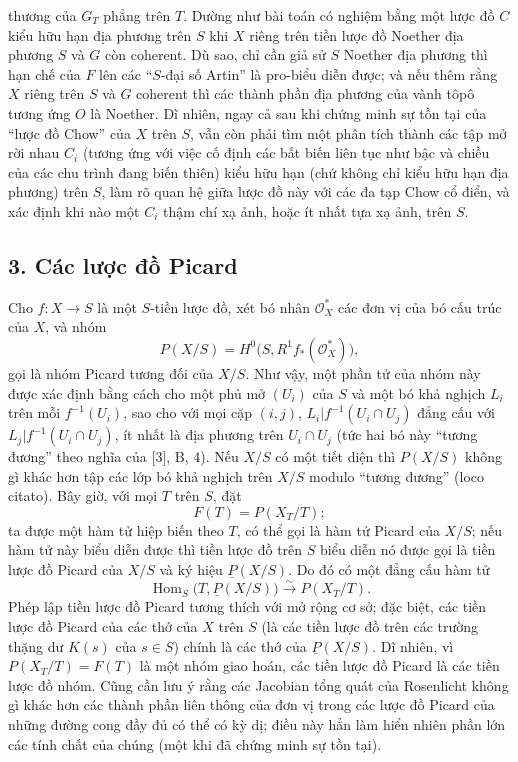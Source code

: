 thương của $G_T$ phẳng trên $T$. Dường như bài toán có nghiệm bằng một lược đồ
$C$ kiểu hữu hạn địa phương trên $S$ khi $X$ riêng trên tiền lược đồ Noether
địa phương $S$ và $G$ còn coherent. Dù sao, chỉ cần giả sử $S$ Noether địa
phương thì hạn chế của $F$ lên các ``$S$-đại số Artin'' là pro-biểu diễn được;
và nếu thêm rằng $X$ riêng trên $S$ và $G$ coherent thì các thành phần địa
phương của vành tôpô tương ứng $O$ là Noether. Dĩ nhiên, ngay cả sau khi chứng
minh sự tồn tại của ``lược đồ Chow'' của $X$ trên $S$, vẫn còn phải tìm một
phân tích thành các tập mở rời nhau $C_i$ (tương ứng với việc cố định các bất
biến liên tục như bậc và chiều của các chu trình đang biến thiên) kiểu hữu hạn
(chứ không chỉ kiểu hữu hạn địa phương) trên $S$, làm rõ quan hệ giữa lược đồ
này với các đa tạp Chow cổ điển, và xác định khi nào một $C_i$ thậm chí xạ ảnh,
hoặc ít nhất tựa xạ ảnh, trên $S$.

\subsection*{3. Các lược đồ Picard}

Cho $f:X\longrightarrow S$ là một $S$-tiền lược đồ, xét bó nhân
$\mathcal O_X^*$ các đơn vị của bó cấu trúc của $X$, và nhóm
\[
  P(X/S)=H^0\bigl(S,R^1f_*(\mathcal O_X^*)\bigr),
\]
gọi là nhóm Picard tương đối của $X/S$. Như vậy, một phần tử của nhóm này được
xác định bằng cách cho một phủ mở $(U_i)$ của $S$ và một bó khả nghịch $L_i$
trên mỗi $f^{-1}(U_i)$, sao cho với mọi cặp $(i,j)$,
$L_i|f^{-1}(U_i\cap U_j)$ đẳng cấu với
$L_j|f^{-1}(U_i\cap U_j)$, ít nhất là địa phương trên $U_i\cap U_j$ (tức hai bó
này ``tương đương'' theo nghĩa của [3], B, 4). Nếu $X/S$ có một tiết diện thì
$P(X/S)$ không gì khác hơn tập các lớp bó khả nghịch trên $X/S$ modulo
``tương đương'' (loco citato). Bây giờ, với mọi $T$ trên $S$, đặt
\[
  F(T)=P(X_T/T) ;
\]
ta được một hàm tử hiệp biến theo $T$, có thể gọi là hàm tử Picard của $X/S$;
nếu hàm tử này biểu diễn được thì tiền lược đồ trên $S$ biểu diễn nó được gọi
là tiền lược đồ Picard của $X/S$ và ký hiệu $\underline P(X/S)$. Do đó có một
đẳng cấu hàm tử
\[
  \operatorname{Hom}_S\bigl(T,\underline P(X/S)\bigr)
  \xrightarrow{\sim}P(X_T/T).
\]
Phép lập tiền lược đồ Picard tương thích với mở rộng cơ sở; đặc biệt, các tiền
lược đồ Picard của các thớ của $X$ trên $S$ (là các tiền lược đồ trên các
trường thặng dư $K(s)$ của $s\in S$) chính là các thớ của
$\underline P(X/S)$. Dĩ nhiên, vì $P(X_T/T)=F(T)$ là một nhóm giao hoán, các
tiền lược đồ Picard là các tiền lược đồ nhóm. Cũng cần lưu ý rằng các Jacobian
tổng quát của Rosenlicht không gì khác hơn các thành phần liên thông của đơn
vị trong các lược đồ Picard của những đường cong đầy đủ có thể có kỳ dị; điều
này hẳn làm hiển nhiên phần lớn các tính chất của chúng (một khi đã chứng minh
sự tồn tại).

